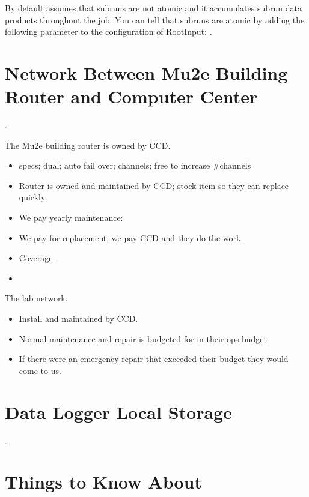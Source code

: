 By default \art assumes that subruns are not atomic and it accumulates subrun data products throughout the job.
You can tell \art that subruns are atomic by adding the following parameter to the configuration of
RootInput: .


\chapter{Network Between Mu2e Building Router and Computer Center}
\label{app:RouterAndNetwork}.

The Mu2e building router is owned by CCD.
\begin{itemize}
\item specs; dual; auto fail over; channels; free to increase \#channels
\item Router is owned and maintained by CCD; stock item so they can replace quickly.
\item We pay yearly maintenance: 
\item We pay for replacement; we pay CCD and they do the work. 
\item {} Coverage.
\item {}
\end{itemize}


The lab network.
\begin{itemize}
\item Install and maintained by CCD.
\item Normal maintenance and repair is budgeted for in their ops budget
\item If there were an emergency repair that exceeded their budget they would come to us. 
\end{itemize}

\chapter{Data Logger Local Storage}
\label{app:DataLoggerLocalStorage}

.

\chapter{Things to Know About \art}

